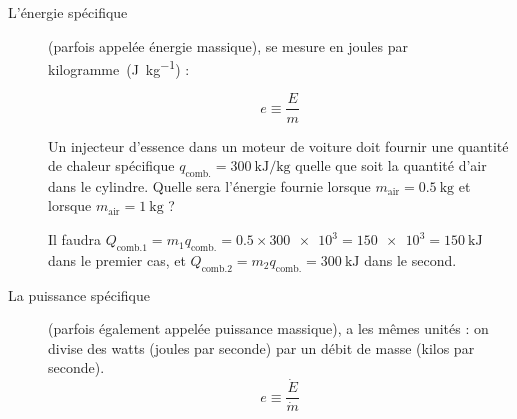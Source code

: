 		\begin{description}
		
			\item[L’énergie spécifique] (parfois appelée énergie massique), se mesure en \si{joules} \si{par} \si{kilogramme}~(\si{\joule\per\kilogram}) :

				\begin{equation}
					e \equiv \frac{E}{m}
				\label{def_énergie_spécifique}
				\end{equation}
		
				\begin{anexample}
					Un injecteur d’essence dans un moteur de voiture doit fournir une quantité de chaleur spécifique $q_{\text{comb.}} = \SI{300}{\kilo\joule\per\kilogram}$ quelle que soit la quantité d’air dans le cylindre. Quelle sera l’énergie fournie lorsque $m_\text{air} = \SI{0,5}{\kilogram}$ et lorsque $m_\text{air} = \SI{1}{\kilogram}$ ?
		
					\begin{answer}Il faudra $Q_{\text{comb.}1} = m_1 q_{\text{comb.}} = \num{0,5} \times \num{300e3} = \num{150e3} = \SI{150}{\kilo\joule}$ dans le premier cas, et $Q_{\text{comb.}2} = m_2 q_{\text{comb.}} = \SI{300}{\kilo\joule}$ dans le second.\end{answer}
					\end{anexample}

		\item[La puissance spécifique] (parfois également appelée puissance massique), a les mê\-mes unités : on divise des \si{watts} (\si{joules} \si{par} \si{seconde}) par un débit de masse (\si{kilos} \si{par} \si{seconde}).
			\begin{equation}
				e \equiv \frac{\dot{E}}{\dot{m}}
				\label{def_puissance_spécifique}
			\end{equation}


\end{description}
